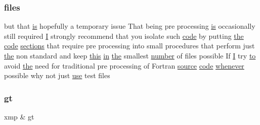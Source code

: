 \subsubsection{\texorpdfstring{files}{files}}
{\footnotesize\ttfamily but that \hyperlink{intro__blas1_83_8txt_a42a91df93f840595de3019ceb5d1df23}{is} hopefully a temporary issue That being pre processing \hyperlink{intro__blas1_83_8txt_a42a91df93f840595de3019ceb5d1df23}{is} occasionally still required \hyperlink{continue_87_8txt_ae7b8826453d28f1bdb2fba7e889eb23b}{I} strongly recommend that you isolate such \hyperlink{ufpp__overview_81_8txt_a74a0615f2d9c4a398d9126096f8092f8}{code} by putting \hyperlink{M__stopwatch_83_8txt_a0f266597de2e57eb3aa964927bb30e14}{the} \hyperlink{ufpp__overview_81_8txt_a74a0615f2d9c4a398d9126096f8092f8}{code} \hyperlink{intro__blas1_83_8txt_aa06cca0b542e18027a508f939187fc96}{sections} that require pre processing into small procedures that perform just \hyperlink{M__stopwatch_83_8txt_a0f266597de2e57eb3aa964927bb30e14}{the} non standard and keep \hyperlink{M__stopwatch_83_8txt_ad62a52042bb610eee5b36b5516caec22}{this} \hyperlink{M__journal_83_8txt_afce72651d1eed785a2132bee863b2f38}{in} \hyperlink{M__stopwatch_83_8txt_a0f266597de2e57eb3aa964927bb30e14}{the} smallest \hyperlink{what__overview_81_8txt_a5168680dcac08de182f59de9a12c38ae}{number} of files possible If \hyperlink{continue_87_8txt_ae7b8826453d28f1bdb2fba7e889eb23b}{I} try \hyperlink{M__stopwatch_83_8txt_a97209fd3e34ef701c0a9734280779cbb}{to} avoid \hyperlink{M__stopwatch_83_8txt_a0f266597de2e57eb3aa964927bb30e14}{the} need for traditional pre processing of Fortran \hyperlink{ufpp__overview_81_8txt_a4d6669ece605d05985c83a04dd38e0ad}{source} \hyperlink{ufpp__overview_81_8txt_a74a0615f2d9c4a398d9126096f8092f8}{code} \hyperlink{do_87_8txt_a810fd937840b16353708346232656a5f}{whenever} possible why not just \hyperlink{intro__blas1_83_8txt_a04fa2694d85f67a675bb3f45f7241f48}{use} test files}

\mbox{\label{ufpp__overview_81_8txt_a592afc8cd0f50f331c87d631446d4186}} 
\subsubsection{\texorpdfstring{gt}{gt}}
{\footnotesize\ttfamily xmp \& gt}

\mbox{\label{ufpp__overview_81_8txt_a3ae3ec26b7cfe41ade65d08668214c9c}} 
